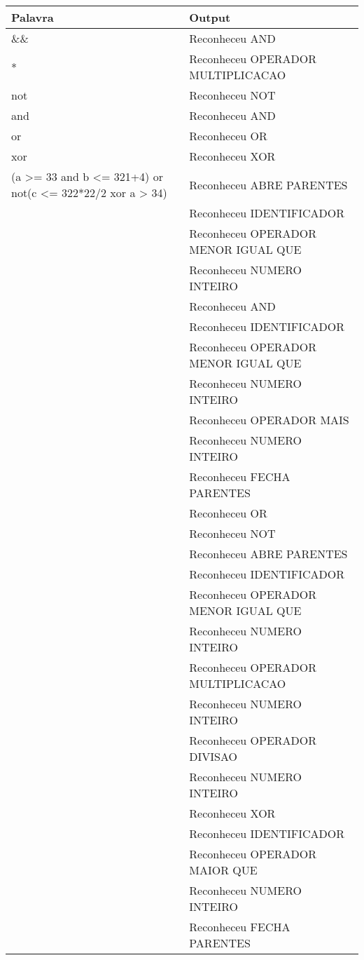 \documentclass[
	article,			%
	11pt,				%
	oneside,			%
	a4paper,			%
	portuguese,			%
	brazil,				%
	sumario=tradicional
	]{abntex2}
\begin{document}
\begin{center}
\begin{table}[H]
\begin{tabularx}{1\textwidth}{p{5cm}|X}
Palavra & Output \\
\hline
\&\& & Reconheceu AND \\
* & Reconheceu OPERADOR MULTIPLICACAO \\
not & Reconheceu NOT \\
and & Reconheceu AND \\
or & Reconheceu OR \\
xor & Reconheceu XOR \\
(a >= 33 and b <= 321+4) or not(c <= 322*22/2 xor a > 34) & Reconheceu ABRE PARENTES \\
\multirow{25}{*}{ }& Reconheceu IDENTIFICADOR \\
& Reconheceu OPERADOR MENOR IGUAL QUE \\
& Reconheceu NUMERO INTEIRO \\
& Reconheceu AND \\
& Reconheceu IDENTIFICADOR \\ 
& Reconheceu OPERADOR MENOR IGUAL QUE \\
& Reconheceu NUMERO INTEIRO \\
& Reconheceu OPERADOR MAIS \\ 
& Reconheceu NUMERO INTEIRO \\
& Reconheceu FECHA PARENTES \\
& Reconheceu OR \\
& Reconheceu NOT \\
& Reconheceu ABRE PARENTES \\
& Reconheceu IDENTIFICADOR \\ 
& Reconheceu OPERADOR MENOR IGUAL QUE \\
& Reconheceu NUMERO INTEIRO \\
& Reconheceu OPERADOR MULTIPLICACAO \\
& Reconheceu NUMERO INTEIRO \\
& Reconheceu OPERADOR DIVISAO \\
& Reconheceu NUMERO INTEIRO \\
& Reconheceu XOR \\
& Reconheceu IDENTIFICADOR \\
& Reconheceu OPERADOR MAIOR QUE \\
& Reconheceu NUMERO INTEIRO \\
& Reconheceu FECHA PARENTES \\ \hline
\end{tabularx}
\end{table}


\end{center}
\end{document}
